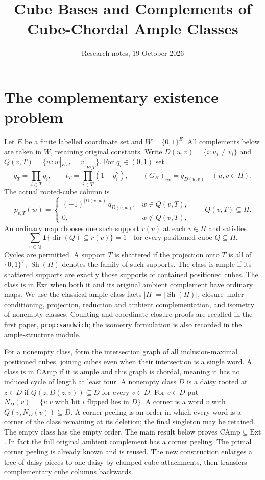 \documentclass[11pt]{article}
\title{Cube Bases and Complements of Cube-Chordal Ample Classes}
\author{}
\date{Research notes, 19 October 2026}
\theoremstyle{definition}
\newcommand{\Sh}{\operatorname{Sh}}
\begin{document}
\maketitle

\section{The complementary existence problem}
Let $E$ be a finite labelled coordinate set and $W=\{0,1\}^E$.
All complements below are taken in $W$, retaining original constants.
Write $D(u,v)=\{i:u_i\ne v_i\}$ and
$Q(v,T)=\{w:w|_{E\setminus T}=v|_{E\setminus T}\}$.
For $q_i\in(0,1)$ set
\[
 q_T=\prod_{i\in T}q_i,\qquad t_T=\prod_{i\in T}(1-q_i^2),
 \qquad (G_H)_{uv}=q_{D(u,v)}\quad(u,v\in H).
\]
The actual rooted-cube column is
\[
 p_{v,T}(w)=\begin{cases}(-1)^{|D(v,w)|}q_{D(v,w)},&w\in Q(v,T),\\
                    0,&w\notin Q(v,T),\end{cases}
 \qquad Q(v,T)\subseteq H.
\]
An ordinary map chooses one such support $r(v)$ at each $v\in H$ and
satisfies
\begin{equation}\label{eq:ordinary}
 \sum_{v\in Q}\mathbf1\{\operatorname{dir}(Q)\subseteq r(v)\}=1
 \quad\text{for every positioned cube }Q\subseteq H.
\end{equation}
Cycles are permitted. A support $T$ is shattered if the projection onto
$T$ is all of $\{0,1\}^T$; $\Sh(H)$ denotes the family of such supports.
The class is ample if its shattered supports are
exactly those supports of contained positioned cubes. The class is in
$\mathrm{Ext}$ when both it and its original ambient complement have
ordinary maps.
We use the classical ample-class facts $|H|=|\Sh(H)|$, closure under
conditioning, projection, reduction and ambient complementation, and
isometry of nonempty classes. Counting and coordinate-closure proofs are
recalled in the \href{../sections/ample_counts.tex}{first paper},
\texttt{prop:sandwich}; the isometry formulation is also recorded in
the \href{../../minor-atlas/research/ample_structure.md}{ample-structure module}.

For a nonempty class, form the intersection graph of all inclusion-maximal
positioned cubes, joining cubes even when their intersection is a single
word. A class is in $\mathrm{CAmp}$ if it is ample and this graph is
chordal, meaning it has no induced cycle of length at least four.
A nonempty class $D$ is a daisy rooted at $z\in D$ if
$Q(z,D(z,v))\subseteq D$ for every $v\in D$.
For $v\in D$ put $N_D(v)=\{i:v\text{ with bit }i\text{ flipped lies in }D\}$.
A corner is a word $v$ with $Q(v,N_D(v))\subseteq D$.
A corner peeling is an order in which every word is a corner of the
class remaining at its deletion; the final singleton may be retained.
The empty class has the empty order.
The main result below proves $\mathrm{CAmp}\subseteq\mathrm{Ext}$.
In fact the full original ambient complement has a corner peeling.
The primal corner peeling is already known and is reused. The new
construction enlarges a tree of daisy pieces to one daisy by clamped
cube attachments, then transfers complementary cube columns backwards.
\end{document}
